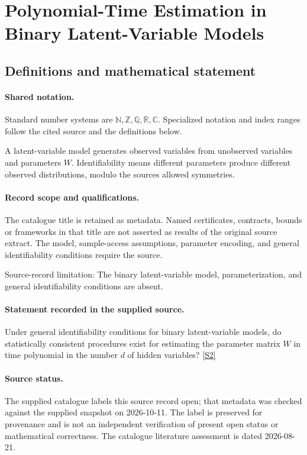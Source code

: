 \documentclass[11pt]{article}
\newcommand{\sref}[2]{\hyperlink{source:#1:#2}{[S#2]}}
\begin{document}
\section{Polynomial-Time Estimation in Binary Latent-Variable Models}\label{statement}

\subsection{Definitions and mathematical statement}

\paragraph{Shared notation.}Standard number systems are $\mathbb N,\mathbb Z,\mathbb Q,\mathbb R,\mathbb C$. Specialized notation and index ranges follow the cited source and the definitions below.


A latent-variable model generates observed variables from unobserved variables and parameters $W$. Identifiability means different parameters produce different observed distributions, modulo the source\textquotesingle s allowed symmetries.
\paragraph{Record scope and qualifications.}
The catalogue title is retained as metadata. Named certificates, contracts, bounds or frameworks in that title are not asserted as results of the original source extract.
The model, sample-access assumptions, parameter encoding, and general identifiability conditions require the source.

Source-record limitation: The binary latent-variable model, parameterization, and general identifiability conditions are absent.
\paragraph{Statement recorded in the supplied source.}
Under general identifiability conditions for binary latent-variable models, do statistically consistent procedures exist for estimating the parameter matrix $W$ in time polynomial in the number $d$ of hidden variables? \sref{statement}{2}
\paragraph{Source status.}
The supplied catalogue labels this source record open; that metadata was checked against the supplied snapshot on 2026-10-11. The label is preserved for provenance and is not an independent verification of present open status or mathematical correctness. The catalogue literature assessment is dated 2026-08-21.
\end{document}
